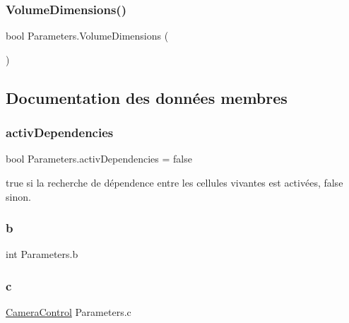 \subsubsection{\texorpdfstring{Volume\+Dimensions()}{VolumeDimensions()}}
{\footnotesize\ttfamily bool Parameters.\+Volume\+Dimensions (\begin{DoxyParamCaption}{ }\end{DoxyParamCaption})\hspace{0.3cm}{\ttfamily [inline]}}







\subsection{Documentation des données membres}
\mbox{\label{class_parameters_a69b261ceea3746beb517d7082a8fc810}} 
\subsubsection{\texorpdfstring{activ\+Dependencies}{activDependencies}}
{\footnotesize\ttfamily bool Parameters.\+activ\+Dependencies = false}



true si la recherche de dépendence entre les cellules vivantes est activées, false sinon. 

\mbox{\label{class_parameters_a701b55ad59ff4744ae7e95139c703145}} 
\subsubsection{\texorpdfstring{b}{b}}
{\footnotesize\ttfamily int Parameters.\+b}

\mbox{\label{class_parameters_aac3a7af7ad68f30d87e89debcb137c1f}} 
\subsubsection{\texorpdfstring{c}{c}}
{\footnotesize\ttfamily \mbox{\hyperlink{class_camera_control}{Camera\+Control}} Parameters.\+c}

